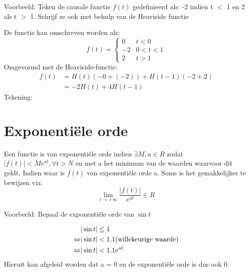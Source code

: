 \documentclass[12pt]{report}
\newcommand{\todo}[1]{
{\color{red}\textunderscore{\textit{TODO: #1}}}
}
\newcommand{\example}[2]{
    \hrulefill
    
    Voorbeeld: #1
    
    #2
    
    \hrulefill
}
\begin{document}
\example{Teken de causale functie $f(t)$ gedefinieerd als: -2 indien t $<$ 1 en 2 als t $>$ 1. Schrijf ze ook met behulp van de Heaviside functie}{
De functie kan omschreven worden als:
$$f(t) = \begin{cases}
        0 & t < 0 \\
        -2 & 0 < t < 1 \\
        2 & t > 1
        \end{cases}
$$
Omgevormd met de Heaviside-functie:
\begin{equation*}
\begin{split}
f(t) & = H(t)(-0 + (-2)) + H(t -  1)(-2 +2) \\
    & = -2H(t) + 4H(t - 1)
\end{split}
\end{equation*}
Tekening:
\todo{graph}
}
\section{Exponentiële orde}
Een functie is van exponentiële orde indien $\exists M, a \in R$ zodat $|f(t)| < Me^{at}, \forall t > N$ en met a het minimum van de waarden waarvoor dit geldt. Indien waar is $f(t)$ van exponentiële orde a.
Soms is het gemakkelijker te bewijzen via:
$$\lim_{t \to +\infty} \frac{|f(t)|}{e^{at}} \in R$$
\example{Bepaal de exponentiële orde van $\sin t$}{
\begin{equation*}
\begin{split}
                & |\sin t| \leq 1 \\
\Leftrightarrow & |\sin t| < 1.1 \hbox{(willekeurige waarde)} \\
\Leftrightarrow & |\sin t| < 1.1e^{at}
\end{split}
\end{equation*}
Hieruit kan afgeleid worden dat a = 0 en de exponentiële orde is dus ook 0.
}
\end{document}

